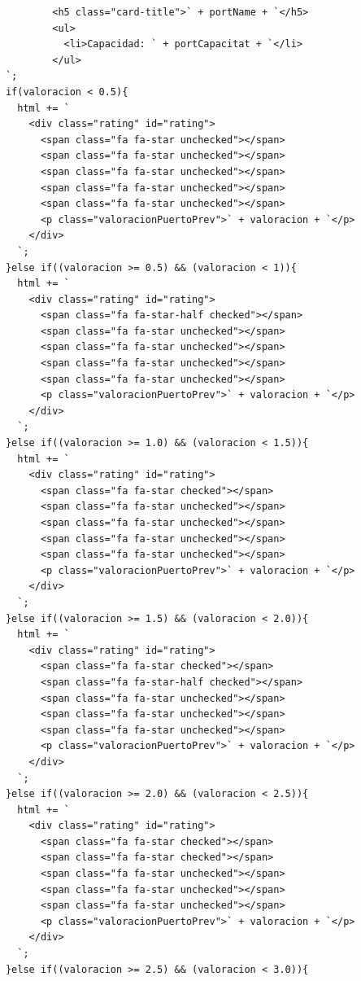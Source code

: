 \documentclass{article}
\begin{document}
\begin{itemize}
\begin{verbatim}
              <h5 class="card-title">` + portName + `</h5>
              <ul>
                <li>Capacidad: ` + portCapacitat + `</li>
              </ul>
      `;
      if(valoracion < 0.5){
        html += `
          <div class="rating" id="rating">
            <span class="fa fa-star unchecked"></span>
            <span class="fa fa-star unchecked"></span>
            <span class="fa fa-star unchecked"></span>
            <span class="fa fa-star unchecked"></span>
            <span class="fa fa-star unchecked"></span>
            <p class="valoracionPuertoPrev">` + valoracion + `</p>
          </div>
        `;
      }else if((valoracion >= 0.5) && (valoracion < 1)){
        html += `
          <div class="rating" id="rating">
            <span class="fa fa-star-half checked"></span>
            <span class="fa fa-star unchecked"></span>
            <span class="fa fa-star unchecked"></span>
            <span class="fa fa-star unchecked"></span>
            <span class="fa fa-star unchecked"></span>
            <p class="valoracionPuertoPrev">` + valoracion + `</p>
          </div>
        `;
      }else if((valoracion >= 1.0) && (valoracion < 1.5)){
        html += `
          <div class="rating" id="rating">
            <span class="fa fa-star checked"></span>
            <span class="fa fa-star unchecked"></span>
            <span class="fa fa-star unchecked"></span>
            <span class="fa fa-star unchecked"></span>
            <span class="fa fa-star unchecked"></span>
            <p class="valoracionPuertoPrev">` + valoracion + `</p>
          </div>
        `;
      }else if((valoracion >= 1.5) && (valoracion < 2.0)){
        html += `
          <div class="rating" id="rating">
            <span class="fa fa-star checked"></span>
            <span class="fa fa-star-half checked"></span>
            <span class="fa fa-star unchecked"></span>
            <span class="fa fa-star unchecked"></span>
            <span class="fa fa-star unchecked"></span>
            <p class="valoracionPuertoPrev">` + valoracion + `</p>
          </div>
        `;
      }else if((valoracion >= 2.0) && (valoracion < 2.5)){
        html += `
          <div class="rating" id="rating">
            <span class="fa fa-star checked"></span>
            <span class="fa fa-star checked"></span>
            <span class="fa fa-star unchecked"></span>
            <span class="fa fa-star unchecked"></span>
            <span class="fa fa-star unchecked"></span>
            <p class="valoracionPuertoPrev">` + valoracion + `</p>
          </div>
        `;
      }else if((valoracion >= 2.5) && (valoracion < 3.0)){

\end{verbatim}
\end{itemize}
\end{document}

